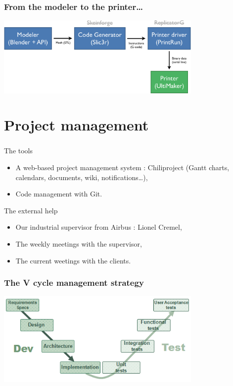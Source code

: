 \documentclass{beamer}
\begin{document}
\begin{frame}
	\frametitle{From the modeler to the printer…}

    \begin{center}
		\includegraphics[width=10cm]{schema}	
	\end{center}
	
\end{frame}

\section{Project management}

\begin{frame}
	\frametitle{}
	\begin{block}{The tools}
    \begin{itemize}
		\item A web-based project management system : Chiliproject (Gantt charts, calendars, documents, wiki, notifications\ldots ),
		\item Code management with Git.
	\end{itemize}
	\end{block}
	
	\begin{block}{The external help}
    \begin{itemize}
		\item Our industrial supervisor from Airbus : Lionel Cremel,
		\item The weekly meetings with the supervisor, 
		\item The current weetings with the clients.
	\end{itemize}
	\end{block}
\end{frame}

\begin{frame}
	\frametitle{The V cycle management strategy}
	\begin{center}
		\includegraphics[width=10cm]{VCycle}	
	\end{center}
    
\end{frame}
\end{document}

